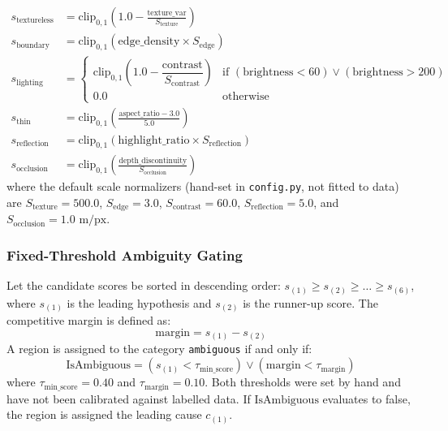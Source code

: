\documentclass[11pt,a4paper]{article}
\begin{document}
\begin{align}
\label{eq:scores}
s_{\mathrm{textureless}} &= \text{clip}_{0,1}\left( 1.0 - \frac{\text{texture\_var}}{S_{\mathrm{texture}}} \right) \\[0.4em]
s_{\mathrm{boundary}} &= \text{clip}_{0,1}\left( \text{edge\_density} \times S_{\mathrm{edge}} \right) \\[0.4em]
s_{\mathrm{lighting}} &= \begin{cases}
\text{clip}_{0,1}\left( 1.0 - \dfrac{\text{contrast}}{S_{\mathrm{contrast}}} \right) & \text{if } (\text{brightness} < 60) \lor (\text{brightness} > 200) \\[0.4em]
0.0 & \text{otherwise}
\end{cases} \\[0.4em]
s_{\mathrm{thin}} &= \text{clip}_{0,1}\left( \frac{\text{aspect\_ratio} - 3.0}{5.0} \right) \\[0.4em]
s_{\mathrm{reflection}} &= \text{clip}_{0,1}\left( \text{highlight\_ratio} \times S_{\mathrm{reflection}} \right) \\[0.4em]
s_{\mathrm{occlusion}} &= \text{clip}_{0,1}\left( \frac{\text{depth\_discontinuity}}{S_{\mathrm{occlusion}}} \right)
\end{align}
where the default scale normalizers (hand-set in \texttt{config.py}, not fitted to data) are $S_{\mathrm{texture}} = 500.0$, $S_{\mathrm{edge}} = 3.0$, $S_{\mathrm{contrast}} = 60.0$, $S_{\mathrm{reflection}} = 5.0$, and $S_{\mathrm{occlusion}} = 1.0\text{ m/px}$.

\subsubsection{Fixed-Threshold Ambiguity Gating}
Let the candidate scores be sorted in descending order: $s_{(1)} \ge s_{(2)} \ge \dots \ge s_{(6)}$, where $s_{(1)}$ is the leading hypothesis and $s_{(2)}$ is the runner-up score. The competitive margin is defined as:
\begin{equation}
\label{eq:margin}
\text{margin} = s_{(1)} - s_{(2)}
\end{equation}
A region is assigned to the category \texttt{ambiguous} if and only if:
\begin{equation}
\label{eq:gate}
\text{IsAmbiguous} = \left( s_{(1)} < \tau_{\mathrm{min\_score}} \right) \lor \left( \text{margin} < \tau_{\mathrm{margin}} \right)
\end{equation}
where $\tau_{\mathrm{min\_score}} = 0.40$ and $\tau_{\mathrm{margin}} = 0.10$. Both thresholds were set by hand and have not been calibrated against labelled data. If $\text{IsAmbiguous}$ evaluates to false, the region is assigned the leading cause $c_{(1)}$.
\end{document}
